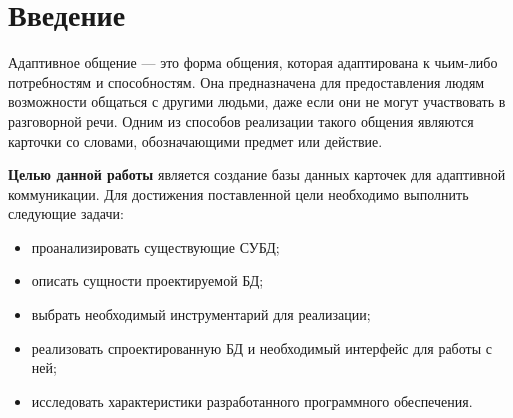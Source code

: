 \chapter*{Введение}

Адаптивное общение --- это форма общения, которая адаптирована к чьим-либо потребностям и способностям. Она предназначена для предоставления людям возможности общаться с другими людьми, даже если они не могут участвовать в разговорной речи. Одним из способов реализации такого общения являются карточки со словами, обозначающими предмет или действие.

\textbf{Целью данной работы} является создание базы данных карточек для адаптивной коммуникации.
Для достижения поставленной цели необходимо выполнить следующие задачи:
\begin{itemize}
	\item проанализировать существующие СУБД;
    \item описать сущности проектируемой БД;
    \item выбрать необходимый инструментарий для реализации;
    \item реализовать спроектированную БД и необходимый интерфейс для работы с ней;
    \item исследовать характеристики разработанного программного обеспечения.
\end{itemize}
